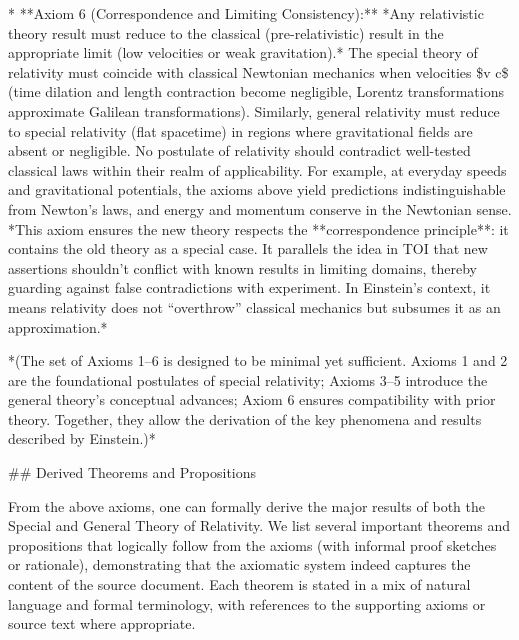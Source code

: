 \documentclass{article}
\begin{document}
* **Axiom 6 (Correspondence and Limiting Consistency):** *Any relativistic theory result must reduce to the classical (pre-relativistic) result in the appropriate limit (low velocities or weak gravitation).* The special theory of relativity must coincide with classical Newtonian mechanics when velocities \$v \ll c\$ (time dilation and length contraction become negligible, Lorentz transformations approximate Galilean transformations). Similarly, general relativity must reduce to special relativity (flat spacetime) in regions where gravitational fields are absent or negligible. No postulate of relativity should contradict well-tested classical laws within their realm of applicability. For example, at everyday speeds and gravitational potentials, the axioms above yield predictions indistinguishable from Newton’s laws, and energy and momentum conserve in the Newtonian sense. *This axiom ensures the new theory respects the **correspondence principle**: it contains the old theory as a special case. It parallels the idea in TOI that new assertions shouldn’t conflict with known results in limiting domains, thereby guarding against false contradictions with experiment. In Einstein’s context, it means relativity does not “overthrow” classical mechanics but subsumes it as an approximation.*

*(The set of Axioms 1–6 is designed to be minimal yet sufficient. Axioms 1 and 2 are the foundational postulates of special relativity; Axioms 3–5 introduce the general theory’s conceptual advances; Axiom 6 ensures compatibility with prior theory. Together, they allow the derivation of the key phenomena and results described by Einstein.)*

## Derived Theorems and Propositions

From the above axioms, one can formally derive the major results of both the Special and General Theory of Relativity. We list several important theorems and propositions that logically follow from the axioms (with informal proof sketches or rationale), demonstrating that the axiomatic system indeed captures the content of the source document. Each theorem is stated in a mix of natural language and formal terminology, with references to the supporting axioms or source text where appropriate.
\end{document}
